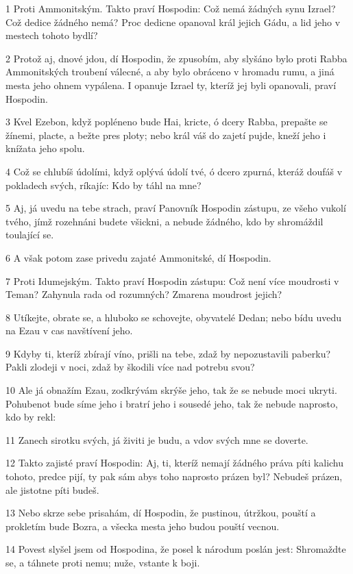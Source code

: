 \par 1 Proti Ammonitským. Takto praví Hospodin: Což nemá žádných synu Izrael? Což dedice žádného nemá? Proc dedicne opanoval král jejich Gádu, a lid jeho v mestech tohoto bydlí?
\par 2 Protož aj, dnové jdou, dí Hospodin, že zpusobím, aby slyšáno bylo proti Rabba Ammonitských troubení válecné, a aby bylo obráceno v hromadu rumu, a jiná mesta jeho ohnem vypálena. I opanuje Izrael ty, kteríž jej byli opanovali, praví Hospodin.
\par 3 Kvel Ezebon, když popléneno bude Hai, kricte, ó dcery Rabba, prepašte se žínemi, placte, a bežte pres ploty; nebo král váš do zajetí pujde, kneží jeho i knížata jeho spolu.
\par 4 Což se chlubíš údolími, když oplývá údolí tvé, ó dcero zpurná, kteráž doufáš v pokladech svých, ríkajíc: Kdo by táhl na mne?
\par 5 Aj, já uvedu na tebe strach, praví Panovník Hospodin zástupu, ze všeho vukolí tvého, jímž rozehnáni budete všickni, a nebude žádného, kdo by shromáždil toulající se.
\par 6 A však potom zase privedu zajaté Ammonitské, dí Hospodin.
\par 7 Proti Idumejským. Takto praví Hospodin zástupu: Což není více moudrosti v Teman? Zahynula rada od rozumných? Zmarena moudrost jejich?
\par 8 Utíkejte, obrate se, a hluboko se schovejte, obyvatelé Dedan; nebo bídu uvedu na Ezau v cas navštívení jeho.
\par 9 Kdyby ti, kteríž zbírají víno, prišli na tebe, zdaž by nepozustavili paberku? Pakli zlodeji v noci, zdaž by škodili více nad potrebu svou?
\par 10 Ale já obnažím Ezau, zodkrývám skrýše jeho, tak že se nebude moci ukryti. Pohubenot bude síme jeho i bratrí jeho i sousedé jeho, tak že nebude naprosto, kdo by rekl:
\par 11 Zanech sirotku svých, já živiti je budu, a vdov svých mne se doverte.
\par 12 Takto zajisté praví Hospodin: Aj, ti, kteríž nemají žádného práva píti kalichu tohoto, predce pijí, ty pak sám abys toho naprosto prázen byl? Nebudeš prázen, ale jistotne píti budeš.
\par 13 Nebo skrze sebe prisahám, dí Hospodin, že pustinou, útržkou, pouští a prokletím bude Bozra, a všecka mesta jeho budou pouští vecnou.
\par 14 Povest slyšel jsem od Hospodina, že posel k národum poslán jest: Shromaždte se, a táhnete proti nemu; nuže, vstante k boji.
